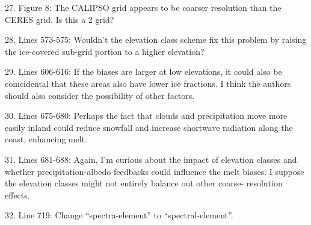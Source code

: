\documentclass[12pt,oneside,a4paper]{article}%
\begin{document}
{\color{blue}{Decided to leave it as.}} \newline

27. Figure 8: The CALIPSO grid appears to be coarser resolution than the CERES grid. Is this a 2 grid? \newline

{\color{blue}{Yes, CALIPSO is on a 2 degree grid. Corrected Table 2. Great catch!}} \newline

28. Lines 573-575: Wouldn’t the elevation class scheme fix this problem by raising the ice-covered sub-grid portion to a higher elevation? \newline

{\color{blue}{That's a good point that we overlooked. We have added a sentence to the end of the next paragraph clarifying that differences between the grid cell mean and actual ice surface are not necessarily problematic due to the EC scheme.}} \newline

29. Lines 606-616: If the biases are larger at low elevations, it could also be coincidental that these areas also have lower ice fractions. I think the authors should also consider the possibility of other factors. \newline

{\color{blue}{We've added references to this coincidence in response to your related questions in the general remarks.}} \newline

30. Lines 675-680: Perhaps the fact that clouds and precipitation move more easily inland could reduce snowfall and increase shortwave radiation along the coast, enhancing melt. \newline

{\color{blue}{See response to general remarks.}} \newline

31. Lines 681-688: Again, I’m curious about the impact of elevation classes and whether precipitation-albedo feedbacks could influence the melt biases. I suppose the elevation classes might not entirely balance out other coarse- resolution effects. \newline

{\color{blue}{See response to general remarks.}} \newline

32. Line 719: Change “spectra-element” to “spectral-element”. \newline
\end{document}
